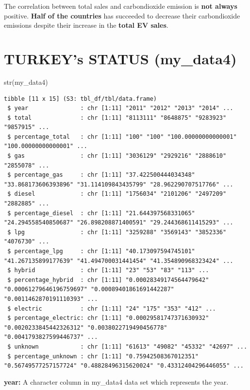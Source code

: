 \documentclass[
  11pt,
  a4paper,
  DIV=11,
  numbers=noendperiod]{scrartcl}
\newenvironment{Shaded}{\begin{snugshade}}{\end{snugshade}}
\newcommand{\FunctionTok}[1]{\textcolor[rgb]{0.28,0.35,0.67}{#1}}
\newcommand{\NormalTok}[1]{\textcolor[rgb]{0.00,0.23,0.31}{#1}}
\begin{document}
The correlation between total sales and carbondioxide emission is
\textbf{not always} positive. \textbf{Half of the countries} has
succeeded to decrease their carbondioxide emissions despite their
increase in the \textbf{total EV sales}.

\section{TURKEY's STATUS (my\_data4)}\label{turkeys-status-my_data4}

\begin{Shaded}
\begin{Highlighting}[]
\FunctionTok{str}\NormalTok{(my\_data4)}
\end{Highlighting}
\end{Shaded}

\begin{verbatim}
tibble [11 x 15] (S3: tbl_df/tbl/data.frame)
 $ year               : chr [1:11] "2011" "2012" "2013" "2014" ...
 $ total              : chr [1:11] "8113111" "8648875" "9283923" "9857915" ...
 $ percentage_total   : chr [1:11] "100" "100" "100.00000000000001" "100.00000000000001" ...
 $ gas                : chr [1:11] "3036129" "2929216" "2888610" "2855078" ...
 $ percentage_gas     : chr [1:11] "37.422500444034348" "33.868173606393896" "31.114109843435799" "28.962290707517766" ...
 $ diesel             : chr [1:11] "1756034" "2101206" "2497209" "2882885" ...
 $ percentage_diesel  : chr [1:11] "21.644397568331065" "24.294558540850687" "26.898208871400591" "29.244368611415293" ...
 $ lpg                : chr [1:11] "3259288" "3569143" "3852336" "4076730" ...
 $ percentage_lpg     : chr [1:11] "40.173097594745101" "41.267135899177639" "41.494700031441454" "41.354890968323424" ...
 $ hybrid             : chr [1:11] "23" "53" "83" "113" ...
 $ percentage_hybrid  : chr [1:11] "0.00028349174564479642" "0.00061279646196759697" "0.00089401861691442287" "0.0011462870191110393" ...
 $ electric           : chr [1:11] "24" "175" "353" "412" ...
 $ percentage_electric: chr [1:11] "0.00029581747371630932" "0.0020233845442326312" "0.0038022719490456778" "0.0041793827599446737" ...
 $ unknown            : chr [1:11] "61613" "49082" "45332" "42697" ...
 $ percentage_unknown : chr [1:11] "0.75942508367012351" "0.56749577257157724" "0.48828496315620024" "0.43312404296446055" ...
\end{verbatim}

\textbf{year:} A character column in my\_data4 data set which represents
the year.
\end{document}

